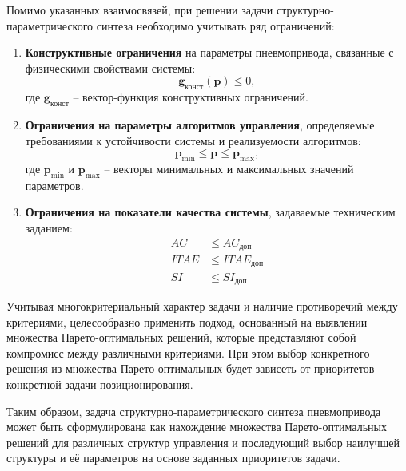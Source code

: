 Помимо указанных взаимосвязей, при решении задачи структурно-параметрического
синтеза необходимо учитывать ряд ограничений:

\begin{enumerate}
	\item \textbf{Конструктивные ограничения} на параметры пневмопривода,
	      связанные с физическими свойствами системы:
	      \begin{equation}
		      \mathbf{g}_{\text{конст}}(\mathbf{p}) \leq 0,
	      \end{equation}
	      где $\mathbf{g}_{\text{конст}}$ -- вектор-функция конструктивных ограничений.

	\item \textbf{Ограничения на параметры алгоритмов управления}, определяемые
	      требованиями к устойчивости системы и реализуемости алгоритмов:
	      \begin{equation}
		      \mathbf{p}_{\min} \leq \mathbf{p} \leq \mathbf{p}_{\max},
	      \end{equation}
	      где $\mathbf{p}_{\min}$ и $\mathbf{p}_{\max}$ -- векторы минимальных и максимальных значений параметров.

	\item \textbf{Ограничения на показатели качества системы}, задаваемые техническим заданием:
	      \begin{equation}
		      \begin{aligned}
			      AC   & \leq AC_{\text{доп}}   \\
			      ITAE & \leq ITAE_{\text{доп}} \\
			      SI   & \leq SI_{\text{доп}}
		      \end{aligned}
	      \end{equation}
\end{enumerate}

Учитывая многокритериальный характер задачи и наличие противоречий между критериями,
целесообразно применить подход, основанный на выявлении множества Парето-оптимальных решений,
которые представляют собой компромисс между различными критериями. При этом выбор конкретного
решения из множества Парето-оптимальных будет зависеть от приоритетов конкретной задачи позиционирования.

Таким образом, задача структурно-параметрического синтеза пневмопривода может быть сформулирована как
нахождение множества Парето-оптимальных решений для различных структур управления и
последующий выбор наилучшей структуры и её параметров на основе заданных приоритетов задачи.
